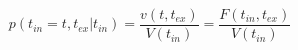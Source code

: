 \begin{equation}
p(t_{in}=t,t_{ex}|t_{in})  = \frac{v(t,t_{ex})}{V(t_{in})}= \frac{F(t_{in},t_{ex})}{V(t_{in})}
\end{equation}